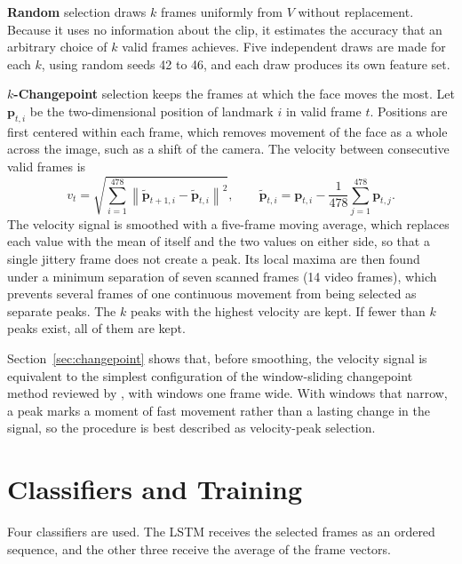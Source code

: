 \textbf{Random} selection draws $k$ frames uniformly from $V$ without replacement. Because it uses no information about the clip, it estimates the accuracy that an arbitrary choice of $k$ valid frames achieves. Five independent draws are made for each $k$, using random seeds 42 to 46, and each draw produces its own feature set.

\textbf{$k$-Changepoint} selection keeps the frames at which the face moves the most. Let $\mathbf{p}_{t,i}$ be the two-dimensional position of landmark $i$ in valid frame $t$. Positions are first centered within each frame, which removes movement of the face as a whole across the image, such as a shift of the camera. The velocity between consecutive valid frames is
\begin{equation}
   v_t = \sqrt{\sum_{i=1}^{478} \left\lVert \tilde{\mathbf{p}}_{t+1,i} - \tilde{\mathbf{p}}_{t,i} \right\rVert^2},
   \qquad
   \tilde{\mathbf{p}}_{t,i} = \mathbf{p}_{t,i} - \frac{1}{478} \sum_{j=1}^{478} \mathbf{p}_{t,j}.
   \label{eq:velocity}
\end{equation}
The velocity signal is smoothed with a five-frame moving average, which replaces each value with the mean of itself and the two values on either side, so that a single jittery frame does not create a peak. Its local maxima are then found under a minimum separation of seven scanned frames (14 video frames), which prevents several frames of one continuous movement from being selected as separate peaks. The $k$ peaks with the highest velocity are kept. If fewer than $k$ peaks exist, all of them are kept.

Section~\ref{sec:changepoint} shows that, before smoothing, the velocity signal is equivalent to the simplest configuration of the window-sliding changepoint method reviewed by , with windows one frame wide. With windows that narrow, a peak marks a moment of fast movement rather than a lasting change in the signal, so the procedure is best described as velocity-peak selection.



\section{Classifiers and Training}
\label{sec:training}

Four classifiers are used. The LSTM receives the selected frames as an ordered sequence, and the other three receive the average of the frame vectors.

